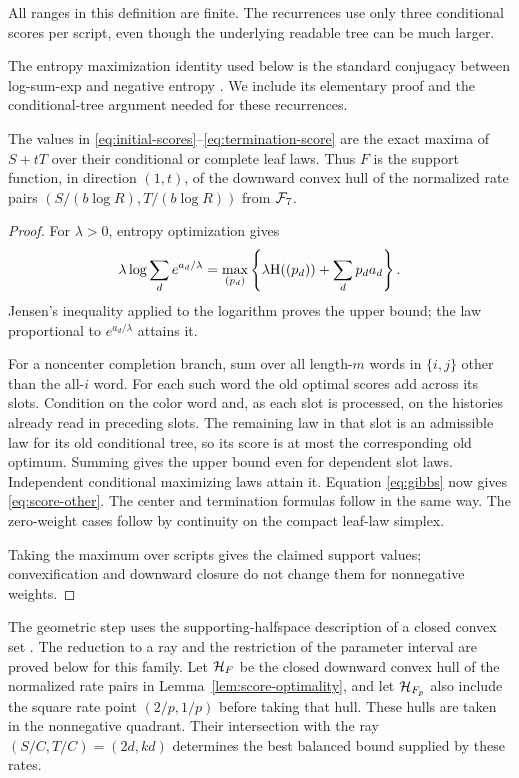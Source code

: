 All ranges in this definition are finite.
The recurrences use only three conditional scores per script, even
though the underlying readable tree can be much larger.

The entropy maximization identity used below is the standard conjugacy
between log-sum-exp and negative entropy
\cite[Example~3.25]{boyd-vandenberghe}.  We include its elementary
proof and the conditional-tree argument needed for these recurrences.

\begin{lemma}\label{lem:score-optimality}
The values in \eqref{eq:initial-scores}--\eqref{eq:termination-score}
are the exact maxima of \(S+tT\) over their conditional or complete
leaf laws.  Thus \(F\) is the support function, in direction \((1,t)\),
of the downward convex hull of the normalized rate pairs
\((S/(b\log R),T/(b\log R))\) from \(\mathcal F_7\).
\end{lemma}

\begin{proof}
For \(\lambda>0\), entropy optimization gives
\begin{equation}\label{eq:gibbs}
 \lambda\log\sum_d e^{a_d/\lambda}
  =\max_{(p_d)}
     \left\{\lambda\mathrm H((p_d))+\sum_d p_d a_d\right\}.
\end{equation}
Jensen's inequality applied to the logarithm proves the upper bound;
the law proportional to \(e^{a_d/\lambda}\) attains it.

For a noncenter completion branch, sum over all length-\(m\)
words in \(\{i,j\}\) other than the all-\(i\) word.
For each such word the old optimal scores add across its slots.
Condition on the color word and, as each slot is processed, on the
histories already read in preceding slots.  The remaining law in
that slot is an admissible law for its old conditional tree, so its
score is at most the corresponding old optimum.  Summing gives the
upper bound even for dependent slot laws.  Independent conditional
maximizing laws attain it.
Equation \eqref{eq:gibbs} now gives \eqref{eq:score-other}.
The center and termination formulas follow in the same way.
The zero-weight cases follow by continuity on the compact leaf-law
simplex.

Taking the maximum over scripts gives the claimed support values;
convexification and downward closure do not change them for
nonnegative weights.
\end{proof}

The geometric step uses the supporting-halfspace description of a
closed convex set \cite[Theorem~8.24]{rockafellar-wets}.  The reduction
to a ray and the restriction of the parameter interval are proved
below for this family.  Let \(\mathcal H_F\) be the closed downward convex
hull of the normalized rate pairs in Lemma~\ref{lem:score-optimality},
and let \(\mathcal H_{F_p}\) also include the square rate point
\((2/p,1/p)\) before taking that hull.  These hulls are taken in the
nonnegative quadrant.  Their intersection with the ray
\((S/C,T/C)=(2d,kd)\) determines the best balanced bound supplied by
these rates.

